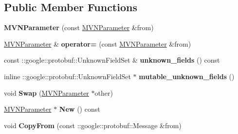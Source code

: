 \subsection*{Public Member Functions}
\begin{DoxyCompactItemize}
\item 
\mbox{\label{classcaffe_1_1_m_v_n_parameter_a4579c80316129d1232af0f5ca2d06f5c}} 
{\bfseries M\+V\+N\+Parameter} (const \mbox{\hyperlink{classcaffe_1_1_m_v_n_parameter}{M\+V\+N\+Parameter}} \&from)
\item 
\mbox{\label{classcaffe_1_1_m_v_n_parameter_a888324b35a29f9fdf651567f3f40bdf6}} 
\mbox{\hyperlink{classcaffe_1_1_m_v_n_parameter}{M\+V\+N\+Parameter}} \& {\bfseries operator=} (const \mbox{\hyperlink{classcaffe_1_1_m_v_n_parameter}{M\+V\+N\+Parameter}} \&from)
\item 
\mbox{\label{classcaffe_1_1_m_v_n_parameter_ab866a8270f2003a9e3025a49bf042b5f}} 
const \+::google\+::protobuf\+::\+Unknown\+Field\+Set \& {\bfseries unknown\+\_\+fields} () const
\item 
\mbox{\label{classcaffe_1_1_m_v_n_parameter_ab86ebabbecf0521d5b5f0dc618c1fb63}} 
inline \+::google\+::protobuf\+::\+Unknown\+Field\+Set $\ast$ {\bfseries mutable\+\_\+unknown\+\_\+fields} ()
\item 
\mbox{\label{classcaffe_1_1_m_v_n_parameter_a4e171bae257670587b9a696b102613ab}} 
void {\bfseries Swap} (\mbox{\hyperlink{classcaffe_1_1_m_v_n_parameter}{M\+V\+N\+Parameter}} $\ast$other)
\item 
\mbox{\label{classcaffe_1_1_m_v_n_parameter_a2f17e82ddf18de00a378d9bf4f552703}} 
\mbox{\hyperlink{classcaffe_1_1_m_v_n_parameter}{M\+V\+N\+Parameter}} $\ast$ {\bfseries New} () const
\item 
\mbox{\label{classcaffe_1_1_m_v_n_parameter_a9009f2ee10768d8de17dc930974b74b3}} 
void {\bfseries Copy\+From} (const \+::google\+::protobuf\+::\+Message \&from)
\item 
\mbox{\label{classcaffe_1_1_m_v_n_parameter_ab437939d137c1d278521aca9250eabc7}} 

\end{DoxyCompactItemize}
